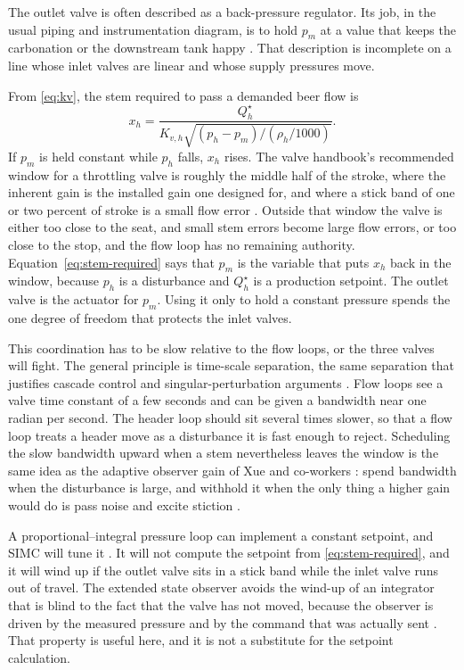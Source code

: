 The outlet valve is often described as a back-pressure regulator. Its job, in the usual piping and instrumentation diagram, is to hold $p_m$ at a value that keeps the carbonation or the downstream tank happy \cite{kunze2014brewing,liptak2006handbook,isa51}. That description is incomplete on a line whose inlet valves are linear and whose supply pressures move.

From \eqref{eq:kv}, the stem required to pass a demanded beer flow is
\begin{equation}
\label{eq:stem-required}
x_h = \frac{Q_h^\star}{K_{v,h}\sqrt{(p_h-p_m)/(\rho_h/1000)}}.
\end{equation}
If $p_m$ is held constant while $p_h$ falls, $x_h$ rises. The valve handbook's recommended window for a throttling valve is roughly the middle half of the stroke, where the inherent gain is the installed gain one designed for, and where a stick band of one or two percent of stroke is a small flow error \cite{fisher2005valve,iec60534general}. Outside that window the valve is either too close to the seat, and small stem errors become large flow errors, or too close to the stop, and the flow loop has no remaining authority. Equation~\eqref{eq:stem-required} says that $p_m$ is the variable that puts $x_h$ back in the window, because $p_h$ is a disturbance and $Q_h^\star$ is a production setpoint. The outlet valve is the actuator for $p_m$. Using it only to hold a constant pressure spends the one degree of freedom that protects the inlet valves.

This coordination has to be slow relative to the flow loops, or the three valves will fight. The general principle is time-scale separation, the same separation that justifies cascade control and singular-perturbation arguments \cite{seborg2016process,khalil2002nonlinear,slotine1991applied,astrom2008feedback}. Flow loops see a valve time constant of a few seconds and can be given a bandwidth near one radian per second. The header loop should sit several times slower, so that a flow loop treats a header move as a disturbance it is fast enough to reject. Scheduling the slow bandwidth upward when a stem nevertheless leaves the window is the same idea as the adaptive observer gain of Xue and co-workers \cite{xue2015airfuel}: spend bandwidth when the disturbance is large, and withhold it when the only thing a higher gain would do is pass noise and excite stiction \cite{lakomy2021cascade,choudhury2005modelling}.

A proportional--integral pressure loop can implement a constant setpoint, and SIMC will tune it \cite{skogestad2003simc}. It will not compute the setpoint from \eqref{eq:stem-required}, and it will wind up if the outlet valve sits in a stick band while the inlet valve runs out of travel. The extended state observer avoids the wind-up of an integrator that is blind to the fact that the valve has not moved, because the observer is driven by the measured pressure and by the command that was actually sent \cite{han2009pid,astrom2006advanced}. That property is useful here, and it is not a substitute for the setpoint calculation.

